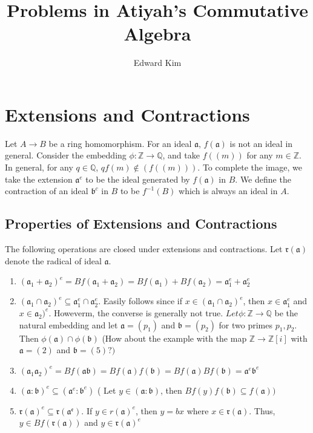 \documentclass[12pt]{article}
\title{Problems in Atiyah's Commutative Algebra}
\author{Edward Kim}
\begin{document}
\maketitle
\clearpage

\section{Extensions and Contractions}

Let $A \rightarrow B$ be a ring homomorphism. For an ideal $\mathfrak{a}$,  $f(\mathfrak{a})$ is not an ideal in general.
Consider the embedding $\phi: \mathbb{Z} \rightarrow \mathbb{Q}$, and take $f((m))$ for any $m \in \mathbb{Z}$. In general, for any
$q \in \mathbb{Q}$, $qf(m) \not\in (f((m)))$. To complete the image, we take the
extension $\mathfrak{a}^e$ to be the ideal generated by $f(\mathfrak{a})$ in $B$. We define the contraction of an ideal $\mathfrak{b}^c$ in $B$ to be
$f^{-1}(B)$ which is always an ideal in $A$.

\subsection{Properties of Extensions and Contractions}

The following operations are closed under extensions and contractions. Let $\mathfrak{r(a)}$ denote the radical of ideal $\mathfrak{a}$. 
\begin{enumerate}
 \item $(\mathfrak{a}_1 + \mathfrak{a}_2)^e = Bf(\mathfrak{a}_1 + \mathfrak{a}_2) = Bf(\mathfrak{a}_1) + Bf(\mathfrak{a}_2) = \mathfrak{a}_1^e + \mathfrak{a}_2^e$
 \item $(\mathfrak{a}_1 \cap \mathfrak{a}_2)^e \subseteq \mathfrak{a}_1^e \cap \mathfrak{a}_2^e$. Easily follows since if $x \in (\mathfrak{a}_1 \cap \mathfrak{a}_2)^e$, then
 $x \in \mathfrak{a}_1^e$ and  $x \in \mathfrak{a}_2)^e$. Howeverm, the converse is generally not true. $Let \phi: \mathbb{Z} \rightarrow \mathbb{Q}$ be the natural embedding and let
 $\mathfrak{a} = (p_1)$ and $\mathfrak{b} = (p_2)$ for two primes $p_1,p_2$. Then $\phi(\mathfrak{a}) \cap \phi(\mathfrak{b})$ (How about the example with the map $\mathbb{Z} \rightarrow \mathbb{Z}[i]$ with
 $\mathfrak{a} = (2)$ and $\mathfrak{b} = (5)?)$
 \item $(\mathfrak{a}_1\mathfrak{a}_2)^e = Bf(\mathfrak{a}\mathfrak{b}) = Bf(\mathfrak{a})f(\mathfrak{b}) =Bf(\mathfrak{a})Bf(\mathfrak{b}) = \mathfrak{a}^e\mathfrak{b}^e$
 \item $(\mathfrak{a} : \mathfrak{b})^e \subseteq (\mathfrak{a}^e : \mathfrak{b}^e)$ ( Let $y \in (\mathfrak{a} : \mathfrak{b})$, then 
 $Bf(y)f(\mathfrak{b}) \subseteq f(\mathfrak{a}))$
 \item $\mathfrak{r(a)}^e \subseteq \mathfrak{r(a^e)}$. If $y \in r(\mathfrak{a})^e$, then $y = bx$ where $x \in \mathfrak{r(a)}$. Thus, $ y \in Bf(\mathfrak{r(a)})$ and $y \in \mathfrak{r(a)}^e$
 \end{enumerate}
\end{document}
